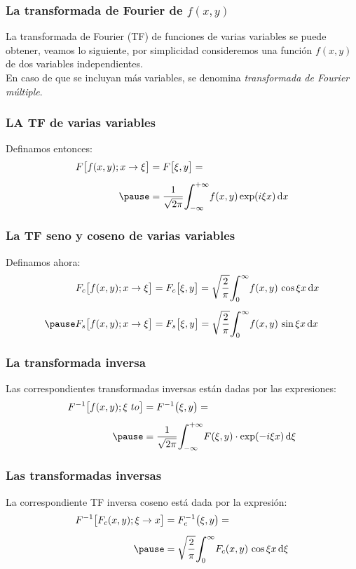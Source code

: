 \documentclass[12pt]{beamer}
\begin{document}
\begin{frame}
\frametitle{La transformada de Fourier de $f(x, y)$}
La transformada de Fourier (TF) de funciones de varias variables se puede obtener, veamos lo siguiente, por simplicidad consideremos una función $f(x, y)$ de dos variables independientes.
\\
\bigskip
\pause
En caso de que se incluyan más variables, se denomina \emph{transformada de Fourier múltiple}.
\end{frame}
\begin{frame}
\frametitle{LA TF de varias variables}
Definamos entonces:
\pause
\begin{eqnarray*}
\begin{aligned}
F \big[ f(x, y); x \to \xi \big] &= F \big[ \xi, y \big] = \\[0.5em] \pause
&= \dfrac{1}{\sqrt{2 \pi}} \scaleint{6ex}_{\bs -\infty}^{+\infty} f(x, y) \exp(i \xi x) \dd{x}
\end{aligned}
\end{eqnarray*}
\end{frame}
\begin{frame}
\frametitle{La TF seno y coseno de varias variables}
Definamos ahora:
\pause
\begin{eqnarray*}
\begin{aligned}
F_{c} \big[ f(x, y); x \to \xi \big] &= F_{c} \big[ \xi, y \big] = \sqrt{\dfrac{2}{\pi}} \scaleint{6ex}_{\bs 0}^{\infty} f(x, y) \, \cos \xi x \dd{x} \\[0.5em] \pause
F_{s} \big[ f(x, y); x \to \xi \big] &= F_{s} \big[ \xi, y \big] = \sqrt{\dfrac{2}{\pi}} \scaleint{6ex}_{\bs 0}^{\infty} f(x, y) \, \sin \xi x \dd{x}
\end{aligned}
\end{eqnarray*}
\end{frame}
\begin{frame}
\frametitle{La transformada inversa}
Las correspondientes transformadas inversas están dadas por las expresiones:
\pause
\begin{eqnarray*}
\begin{aligned}
F^{-1} \big[ f(x, y); \xi \ to \big] &= F^{-1} \big( \xi, y \big) = \\[0.5em]  \pause
&= \dfrac{1}{\sqrt{2 \pi}} \scaleint{6ex}_{\bs -\infty}^{+\infty} F(\xi, y) \cdot \exp(-i \xi x) \dd{\xi}
\end{aligned}
\end{eqnarray*}
\end{frame}
\begin{frame}
\frametitle{Las transformadas inversas}
La correspondiente TF inversa coseno está dada por la expresión:
\pause
\begin{eqnarray*}
\begin{aligned}
F^{-1} \big[ F_{c}(x, y); \xi \to x \big] &= F_{c}^{-1} \big( \xi, y \big) = \\[0.5em]  \pause
&= \sqrt{\dfrac{2}{\pi}} \scaleint{6ex}_{\bs 0}^{\infty} F_{c} (x, y) \, \cos \xi x \dd{\xi} \\[0.5em]
\end{aligned}
\end{eqnarray*}
\end{frame}
\end{document}
